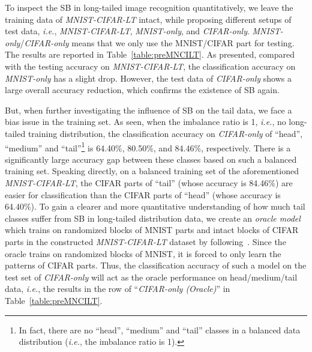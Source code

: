 \documentclass[10pt,journal,compsoc]{IEEEtran}
\newcommand{\ie}{\emph{i.e.}}
\begin{document}
To inspect the SB in long-tailed image recognition quantitatively, we leave the training data of \emph{MNIST-CIFAR-LT} intact, while proposing different setups of test data, \ie, \emph{MNIST-CIFAR-LT}, \emph{MNIST-only}, and \emph{CIFAR-only}. \emph{MNIST-only}/\emph{CIFAR-only} means that we only use the MNIST/CIFAR part for testing. The results are reported in Table~\ref{table:preMNCILT}. As presented, compared with the testing accuracy on \emph{MNIST-CIFAR-LT}, the classification accuracy on \emph{MNIST-only} has a slight drop. However, the test data of \emph{CIFAR-only} shows a large overall accuracy reduction, which confirms the existence of SB again.

But, when further investigating the influence of SB on the tail data, we face a bias issue in the training set. As seen, when the imbalance ratio is 1, \ie, no long-tailed training distribution, the classification accuracy on \emph{CIFAR-only} of ``head'', ``medium'' and ``tail''\footnote{In fact, there are no ``head'', ``medium'' and ``tail'' classes in a balanced data distribution (\ie, the imbalance ratio is 1).} is 64.40\%, 80.50\%, and 84.46\%, respectively. There is a significantly large accuracy gap between these classes based on such a balanced training set. Speaking directly, on a balanced training set of the aforementioned \emph{MNIST-CIFAR-LT}, the CIFAR parts of ``tail'' (whose accuracy is 84.46\%) are easier for classification than the CIFAR parts of ``head'' (whose accuracy is 64.40\%). To gain a clearer and more quantitative understanding of how much tail classes suffer from SB in long-tailed distribution data, we create an \emph{oracle model} which trains on randomized blocks of MNIST parts and intact blocks of CIFAR parts in the constructed \emph{MNIST-CIFAR-LT} dataset by following~\cite{OOD}. Since the oracle trains on randomized blocks of MNIST, it is forced to only learn the patterns of CIFAR parts. Thus, the classification accuracy of such a model on the test set of \emph{CIFAR-only} will act as the oracle performance on head/medium/tail data, \ie, the results in the row of ``\emph{CIFAR-only (Oracle)}'' in Table~\ref{table:preMNCILT}.
\end{document}
